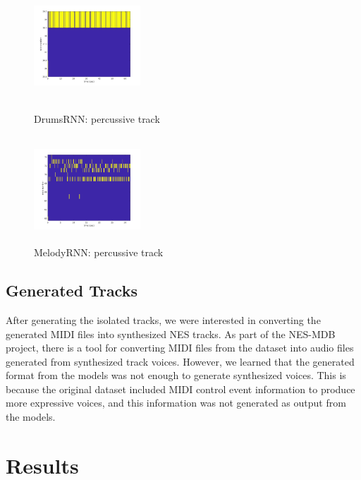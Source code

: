 \documentclass{article}
\begin{document}
\begin{figure}[htb!]
  \begin{minipage}{0.48\textwidth}
    \centering
    \includegraphics[height=4cm, width=4cm]{img/DrumRNN_drum.jpg}
    \caption{DrumsRNN: percussive track}
  \end{minipage}\hfill
  \begin{minipage}{0.48\textwidth}
    \centering
    \includegraphics[height=4cm, width=4cm]{img/MelodyRNN_drum.jpg}
    \caption{MelodyRNN: percussive track}
  \end{minipage}
\end{figure}

\subsection{Generated Tracks}
After generating the isolated tracks, we were interested in converting the generated MIDI files into synthesized NES tracks. As part of the NES-MDB project, there is a tool for converting MIDI files from the dataset into audio files generated from synthesized track voices. However, we learned that the generated format from the models was not enough to generate synthesized voices. This is because the original dataset included MIDI control event information to produce more expressive voices, and this information was not generated as output from the models.


\section{Results}
\end{document}
